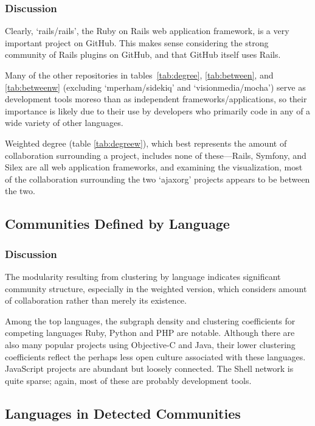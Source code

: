 \documentclass[11pt]{article}
\begin{document}


\subsubsection{Discussion}
Clearly, `rails/rails', the Ruby on Rails web application framework, is a very
important project on GitHub. This makes sense considering the strong community
of Rails plugins on GitHub, and that GitHub itself uses Rails.

Many of the other repositories in tables~\ref{tab:degree}, \ref{tab:between},
and \ref{tab:betweenw} (excluding `mperham/sidekiq' and `visionmedia/mocha')
serve as development tools moreso than as independent frameworks/applications,
so their importance is likely due to their use by developers who primarily code
in any of a wide variety of other languages.

Weighted degree (table \ref{tab:degreew}), which best represents the amount of
collaboration surrounding a project, includes none of these---Rails, Symfony,
and Silex are all web application frameworks, and examining the visualization,
most of the collaboration surrounding the two `ajaxorg' projects appears to be
between the two.

\subsection{Communities Defined by Language}



\subsubsection{Discussion}
The modularity resulting from clustering by language indicates significant
community structure, especially in the weighted version, which considers amount
of collaboration rather than merely its existence.

Among the top languages, the subgraph density and clustering coefficients for
competing languages Ruby, Python and PHP are notable. Although there are also
many popular projects using Objective-C and Java, their lower clustering
coefficients reflect the perhaps less open culture associated with these
languages. JavaScript projects are abundant but loosely connected. The Shell
network is quite sparse; again, most of these are probably development tools. 

\subsection{Languages in Detected Communities}
\end{document}

